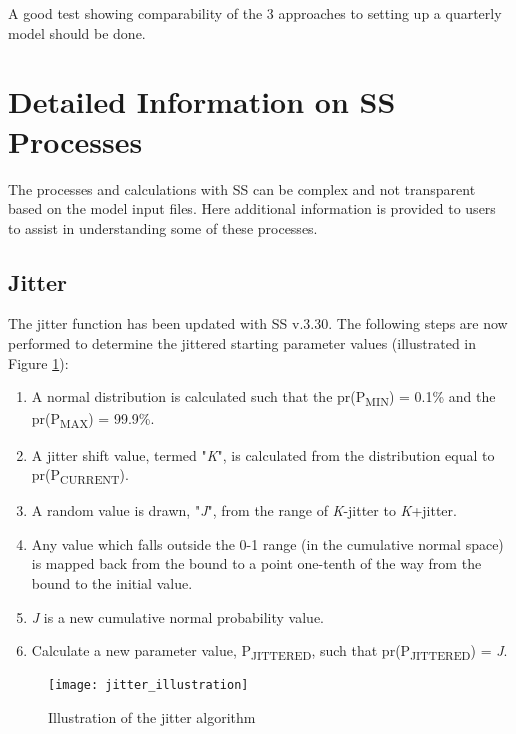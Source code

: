 A good test showing comparability of the 3 approaches to setting up a quarterly model should be done.

\pagebreak


\section{Detailed Information on SS Processes}

The processes and calculations with SS can be complex and not transparent based on the model input files. Here additional information is provided to users to assist in understanding some of these processes.

\subsection{Jitter}
\hypertarget{Jitter}{}
The jitter function has been updated with SS v.3.30.  The following steps are now performed to determine the jittered starting parameter values (illustrated in Figure \ref{fig:jitter}):
\begin{enumerate}
	\item A normal distribution is calculated such that the pr(P\textsubscript{MIN}) = 0.1\% and the pr(P\textsubscript{MAX}) = 99.9\%.
	\item A jitter shift value, termed "\textit{K}", is calculated from the distribution equal to pr(P\textsubscript{CURRENT}).
	\item A random value is drawn, "\textit{J}", from the range of \textit{K}-jitter to \textit{K}+jitter.
	\item Any value which falls outside the 0-1 range (in the cumulative normal space) is mapped back from the bound to a point one-tenth of the way from the bound to the initial value.
	\item \textit{J} is a new cumulative normal probability value.
	\item Calculate a new parameter value, P\textsubscript{JITTERED}, such that pr(P\textsubscript{JITTERED}) = \textit{J}.
\end{enumerate}

\begin{figure}[h]
	\begin{center}
		\texttt{[image: jitter\_illustration]}\\
		\caption{Illustration of the jitter algorithm}
		\label{fig:jitter}
	\end{center}
\end{figure}


